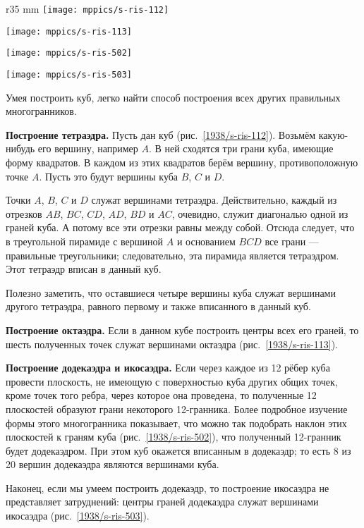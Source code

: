 \begin{wrapfigure}{r}{35 mm}
\vskip-0mm
\centering
\texttt{[image: mppics/s-ris-112]}
\caption{}\label{1938/s-ris-112}
\bigskip
\texttt{[image: mppics/s-ris-113]}
\caption{}\label{1938/s-ris-113}
\bigskip
\texttt{[image: mppics/s-ris-502]}
\caption{}\label{1938/s-ris-502}
\bigskip
\texttt{[image: mppics/s-ris-503]}
\caption{}\label{1938/s-ris-503}
\vskip-0mm
\end{wrapfigure}

Умея построить куб, легко найти способ построения всех других правильных многогранников.

\textbf{Построение тетраэдра.}
Пусть дан куб (рис.~\ref{1938/s-ris-112}).
Возьмём какую-нибудь его вершину, например $A$.
В ней сходятся три грани куба, имеющие форму квадратов.
В каждом из этих квадратов берём вершину, противоположную точке $A$.
Пусть это будут вершины куба $B$, $C$ и $D$.

Точки $A$, $B$, $C$ и $D$ служат вершинами тетраэдра.
Действительно, каждый из отрезков $AB$, $BC$, $CD$, $AD$, $BD$ и $AC$, очевидно, служит диагональю одной из граней куба.
А потому все эти отрезки равны между собой.
Отсюда следует, что в треугольной пирамиде с вершиной $A$ и основанием $BCD$ все грани — правильные треугольники; следовательно, эта пирамида является тетраэдром.
Этот тетраэдр вписан в данный куб.

Полезно заметить, что оставшиеся четыре вершины куба служат вершинами другого тетраэдра, равного первому и также вписанного в данный куб.


\textbf{Построение октаэдра.}
Если в данном кубе построить центры всех его граней, то шесть полученных точек служат вершинами октаэдра (рис.~\ref{1938/s-ris-113}).

\textbf{Построение додекаэдра и икосаэдра.}
Если через каждое из 12 рёбер куба провести плоскость, не имеющую с поверхностью куба других общих точек, кроме точек того ребра, через которое она проведена, то полученные 12 плоскостей образуют грани некоторого 12-гранника.
Более подробное изучение формы этого многогранника показывает, что можно так подобрать наклон этих плоскостей к граням куба (рис.~\ref{1938/s-ris-502}), что полученный 12-гранник будет додекаэдром.
При этом куб окажется вписанным в додекаэдр; то есть 8 из 20 вершин додекаэдра являются вершинами куба.

Наконец, если мы умеем построить додекаэдр, то построение икосаэдра не представляет затруднений: центры граней додекаэдра служат вершинами икосаэдра (рис.~\ref{1938/s-ris-503}).

